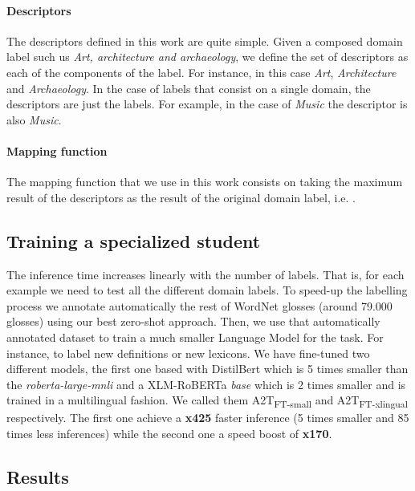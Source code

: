 \documentclass[11pt]{article}
\begin{document}
\paragraph{Descriptors} The descriptors defined in this work are quite simple. Given a composed domain label such us {\it Art, architecture and archaeology}, we define the set of descriptors as each of the components of the label. For instance, in this case {\it Art}, {\it Architecture} and {\it Archaeology}. In the case of labels that consist on a single domain, the descriptors are just the labels. For example, in the case of {\it Music} the descriptor is also {\it Music}.

\paragraph{Mapping function} The mapping function that we use in this work consists on taking the maximum result of the descriptors as the result of the original domain label, i.e. .

\subsection{Training a specialized student}

The inference time increases linearly with the number of labels. That is, for each example we need to test all the different domain labels. To speed-up the labelling process we annotate automatically the rest of WordNet glosses (around 79.000 glosses) using our best zero-shot approach. Then, we use that automatically annotated dataset to train a much smaller Language Model for the task. For instance, to label new definitions or new lexicons. We have fine-tuned two different models, the first one based with DistilBert \cite{sanh2019distilbert} which is 5 times smaller than the \textit{roberta-large-mnli} and a XLM-RoBERTa \cite{conneau2019unsupervised} \textit{base} which is 2 times smaller and is trained in a multilingual fashion. We called them A2T\textsubscript{FT-small} and A2T\textsubscript{FT-xlingual} respectively. The first one achieve a \textbf{x425} faster inference (5 times smaller and 85 times less inferences) while the second one a speed boost of \textbf{x170}.

\subsection{Results}
\end{document}
